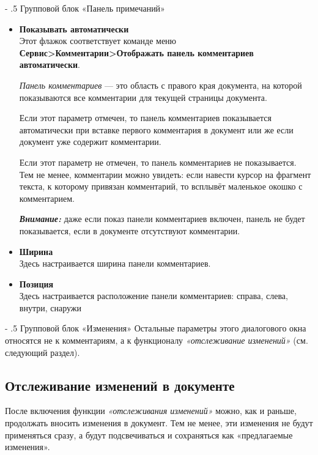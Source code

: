 ﻿\documentclass[a4paper,10pt]{article}
\makeatletter
\renewcommand\paragraph{%
   \@startsection{paragraph}{4}{0mm}%
      {-\baselineskip}%
      {.5\baselineskip}%
      {\normalfont\normalsize\bfseries}}
\makeatother
\begin{document}
\paragraph{Групповой блок «Панель примечаний»}
\begin{itemize}
 \item \textbf{Показывать автоматически}\\
 Этот флажок соответствует команде меню \textbf{Сервис>Комментарии>Отображать панель комментариев автоматически}.
 
 \textit{Панель комментариев} — это область с правого края документа, на которой показываются все комментарии для текущей страницы документа.
 
 Если этот параметр отмечен, то панель комментариев показывается автоматически при вставке первого комментария в документ или же если документ уже содержит комментарии.
 
 Если этот параметр не отмечен, то панель комментариев не показывается. Тем не менее, комментарии можно увидеть: если навести курсор на фрагмент текста, к которому привязан комментарий, то всплывёт маленькое окошко с комментарием.
 
 \begin{mdframed}[backgroundcolor=blue!10]
\textbf{\textit{Внимание:}} даже если показ панели комментариев включен, панель не будет показывается, если в документе отсутствуют комментарии.
\end{mdframed}

\item \textbf{Ширина}\\
Здесь настраивается ширина панели комментариев.
\item \textbf{Позиция}\\
Здесь настраивается расположение панели комментариев: справа, слева, внутри, снаружи
\end{itemize}

\paragraph{Групповой блок «Изменения»}
Остальные параметры этого диалогового окна относятся не к комментариям, а к функционалу \textit{«отслеживание изменений»} (см. следующий раздел).

\subsection{Отслеживание изменений в документе}
После включения функции \textit{«отслеживания изменений»} можно, как и раньше, продолжать вносить изменения в документ. Тем не менее, эти изменения не будут применяться сразу, а будут подсвечиваться и сохраняться как «предлагаемые изменения».
\end{document}
